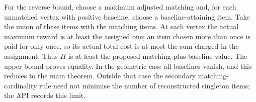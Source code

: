 For the reverse bound, choose a maximum adjusted matching and, for each
unmatched vertex with positive baseline, choose a baseline-attaining item.
Take the union of these items with the matching items. At each vertex
the actual maximum reward is at least the assigned one; an item chosen
more than once is paid for only once, so its actual total cost is at most
the sum charged in the assignment. Thus $H$ is at least the proposed
matching-plus-baseline value. The upper bound proves equality. In the
geometric case all baselines vanish, and this reduces to the main theorem.
Outside that case the secondary matching-cardinality rule need not minimise
the number of reconstructed singleton items; the API records this limit.

